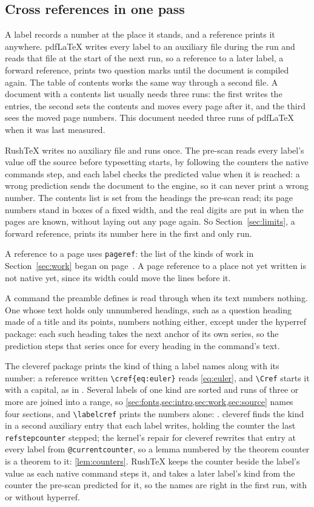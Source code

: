 \documentclass{article}
\numberwithin{equation}{section}
\theoremstyle{definition}
\theoremstyle{remark}
\begin{document}
\subsection{Cross references in one pass}

A label records a number at the place it stands, and a reference prints it anywhere.
pdfLaTeX writes every label to an auxiliary file during the run and reads that file at
the start of the next run, so a reference to a later label, a forward reference, prints
two question marks until the document is compiled again. The table of contents works the
same way through a second file. A document with a contents list usually needs three
runs: the first writes the entries, the second sets the contents and moves every page
after it, and the third sees the moved page numbers. This document needed three runs of
pdfLaTeX when it was last measured.

RushTeX writes no auxiliary file and runs once. The pre-scan reads every label's value
off the source before typesetting starts, by following the counters the native commands
step, and each label checks the predicted value when it is reached: a wrong prediction
sends the document to the engine, so it can never print a wrong number. The contents
list is set from the headings the pre-scan read; its page numbers stand in boxes of a
fixed width, and the real digits are put in when the pages are known, without laying
out any page again. So Section~\ref{sec:limits}, a forward reference, prints its number
here in the first and only run.

A reference to a page uses \texttt{pageref}: the list of the kinds of work in
Section~\ref{sec:work} began on page~\pageref{item:first}. A page reference to a
place not yet written is not native yet, since its width could move the lines before
it.

A command the preamble defines is read through when its text numbers nothing. One whose
text holds only unnumbered headings, such as a question heading made of a title and its
points, numbers nothing either, except under the hyperref package: each such heading takes
the next anchor of its own series, so the prediction steps that series once for every
heading in the command's text.

The cleveref package prints the kind of thing a label names along with its number: a
reference written \verb|\cref{eq:euler}| reads \cref{eq:euler}, and \verb|\Cref| starts
it with a capital, as in . Several labels of one kind are sorted and runs
of three or more are joined into a range, so \cref{sec:fonts,sec:intro,sec:work,sec:source}
names four sections, and \verb|\labelcref| prints the numbers alone:
. cleveref finds the kind in a second auxiliary entry that
each label writes, holding the counter the last \texttt{refstepcounter} stepped; the
kernel's repair for cleveref rewrites that entry at every label from
\texttt{@currentcounter}, so a lemma numbered by the theorem counter is a theorem to it:
\cref{lem:counters}. RushTeX keeps the counter beside the label's value as each native
command steps it, and takes a later label's kind from the counter the pre-scan predicted
for it, so the names are right in the first run, with or without hyperref.
\end{document}
